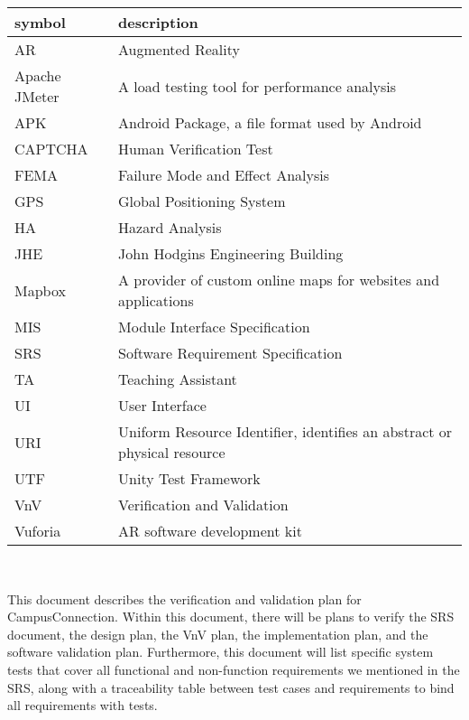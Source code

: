 \documentclass[12pt, titlepage]{article}
\begin{document}
\renewcommand{\arraystretch}{1.2}
\begin{tabular}{l l} 
  \toprule		
  \textbf{symbol} & \textbf{description}\\
  \midrule 
  AR & Augmented Reality\\
  \midrule
  Apache JMeter & A load testing tool for performance analysis\\
  \midrule
  APK & Android Package, a file format used by Android\\
  \midrule
  CAPTCHA & Human Verification Test\\
  \midrule
  FEMA & Failure Mode and Effect Analysis\\
  \midrule
  GPS & Global Positioning System\\
  \midrule
  HA & Hazard Analysis\\
  \midrule
  JHE & John Hodgins Engineering Building\\
  \midrule
  Mapbox & A provider of custom online maps for websites and applications\\
  \midrule
  MIS & Module Interface Specification\\
  \midrule
  SRS & Software Requirement Specification\\
  \midrule
  TA & Teaching Assistant\\
  \midrule
  UI & User Interface\\
  \midrule
  URI & Uniform Resource Identifier, identifies an abstract or physical resource\\
  \midrule
  UTF & Unity Test Framework\\
  \midrule
  VnV & Verification and Validation\\
  \midrule
  Vuforia & AR software development kit\\
  \bottomrule
\end{tabular}\\

\newpage


This document describes the verification and validation plan for CampusConnection.  Within this document, there will be plans to verify the SRS document, the design plan, the VnV plan, the implementation plan, and the software validation plan.  Furthermore, this document will list specific system tests that cover all functional and non-function requirements we mentioned in the SRS, along with a traceability table between test cases and requirements to bind all requirements with tests. 
\end{document}
